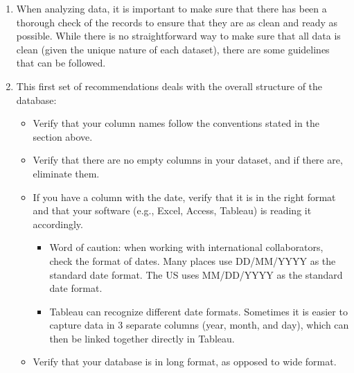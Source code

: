 \documentclass[
]{book}
\begin{document}
\begin{enumerate}
\def\labelenumi{\arabic{enumi}.}
\item
  When analyzing data, it is important to make sure that there has been a thorough check of the records to ensure that they are as clean and ready as possible. While there is no straightforward way to make sure that all data is clean (given the unique nature of each dataset), there are some guidelines that can be followed.
\item
  This first set of recommendations deals with the overall structure of the database:

  \begin{itemize}
  \item
    Verify that your column names follow the conventions stated in the section above.
  \item
    Verify that there are no empty columns in your dataset, and if there are, eliminate them.
  \item
    If you have a column with the date, verify that it is in the right format and that your
    software (e.g., Excel, Access, Tableau) is reading it accordingly.

    \begin{itemize}
    \item
      Word of caution: when working with international collaborators, check the format of dates. Many places use DD/MM/YYYY as the standard date format. The US uses MM/DD/YYYY as the standard date format.
    \item
      Tableau can recognize different date formats. Sometimes it is easier to capture data in 3 separate columns (year, month, and day), which can then be linked together directly in Tableau.
    \end{itemize}
  \item
    Verify that your database is in long format, as opposed to wide format.


\end{itemize}
\end{enumerate}
\end{document}
